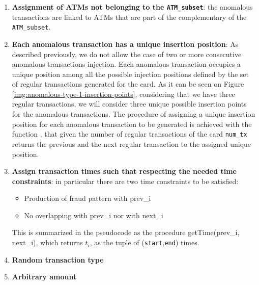 \begin{enumerate}
  \item \textbf{Assignment of ATMs not belonging to the \texttt{ATM\_subset}}: the anomalous transactions are linked to ATMs that are part of the complementary of the \texttt{ATM\_subset}.
  \item \textbf{Each anomalous transaction has a unique insertion position}: As described previously, we do not allow the case of two or more consecutive anomalous transactions injection. Each anomalous transaction occupies a unique position among all the possible injection positions defined by the set of regular transactions generated for the card. As it can be seen on Figure \ref{img:anomalous-type-1-insertion-points}, considering that we have three regular transactions, we will consider three unique possible insertion points for the anomalous transactions. The procedure of assigning a unique insertion position for each anomalous transaction to be generated is achieved with the function , that given the number of regular transactions of the card \texttt{num\_tx} returns the previous and the next regular transaction to the assigned unique position.
  \item \textbf{Assign transaction times such that respecting the needed time constraints}: in particular there are two time constraints to be satisfied:
  \begin{itemize}
    \item Production of fraud pattern with prev\_i
    \item No overlapping with prev\_i nor with next\_i
  \end{itemize}
  This is summarized in the pseudocode as the procedure getTime(prev\_i, next\_i), which returns $t_i$, as the tuple of (\texttt{start},\texttt{end}) times.
  \item \textbf{Random transaction type}
  \item \textbf{Arbitrary amount}
 
\end{enumerate}


